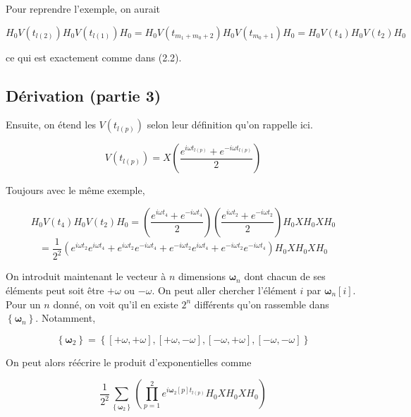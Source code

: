 Pour reprendre l'exemple, on aurait 

\begin{equation*}
    H_0V(t_{l(2)})H_0V(t_{l(1)})H_0 = H_0V(t_{m_1 + m_0 + 2})H_0V(t_{m_0 + 1})H_0 = H_0V(t_4)H_0V(t_2)H_0
\end{equation*}

ce qui est exactement comme dans (2.2).

\subsection{Dérivation (partie 3)}
Ensuite, on étend les $V(t_{l(p)})$ selon leur définition qu'on rappelle ici.

\begin{equation*}
    V(t_{l(p)}) = X\left(\frac{e^{i\omega t_{l(p)}} + e^{-i\omega t_{l(p)}}}{2}\right)
\end{equation*}

Toujours avec le même exemple,

\begin{equation*}
    H_0V(t_4)H_0V(t_2)H_0 = \left(\frac{e^{i\omega t_4} + e^{-i\omega t_4}}{2}\right)\left(\frac{e^{i\omega t_2} + e^{-i\omega t_2}}{2}\right)H_0XH_0XH_0 
\end{equation*}
\begin{equation*}
    = \frac{1}{2^2}\left(e^{i\omega t_2}e^{i\omega t_4} + e^{i\omega t_2}e^{-i\omega t_4} + e^{-i\omega t_2}e^{i\omega t_4} + e^{-i\omega t_2}e^{-i\omega t_4}\right)H_0XH_0XH_0
\end{equation*}

On introduit maintenant le vecteur à $n$ dimensions $\boldsymbol{\omega}_n$ dont chacun de ses éléments peut soit être $+\omega$ ou $-\omega$. On peut aller chercher l'élément $i$ par $\boldsymbol{\omega}_n[i]$. Pour un $n$ donné, on voit qu'il en existe $2^n$ différents qu'on rassemble dans $\left\{\boldsymbol{\omega}_n\right\}$. Notamment, 

\begin{equation*}
    \left\{\boldsymbol{\omega}_2\right\} = \left\{\left[+\omega, +\omega\right], \left[+\omega, -\omega\right], \left[-\omega, +\omega\right], \left[-\omega, -\omega\right]\right\}    
\end{equation*}

On peut alors réécrire le produit d'exponentielles comme

\begin{equation*}
    \frac{1}{2^2}\sum_{\left\{\boldsymbol{\omega}_2\right\}}\left(\prod_{p=1}^{2}e^{i\boldsymbol{\omega}_2[p]t_{l(p)}} H_0XH_0XH_0\right)
\end{equation*}

